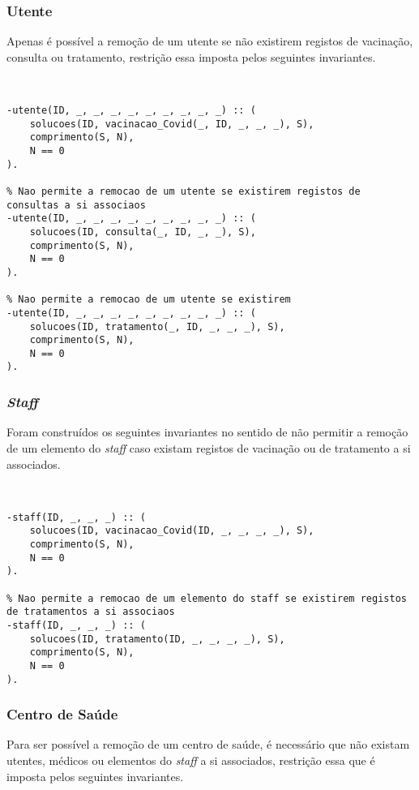 \subsubsection*{Utente}
Apenas é possível a remoção de um utente se não existirem registos de vacinação, consulta ou tratamento, restrição essa
imposta pelos seguintes invariantes.

\

\begin{lstlisting}[caption={Invariantes de remoção relativos ao predicado \texttt{utente}}]
% Nao permite a remocao de um utente se existirem registos de vacinacao a si associados
-utente(ID, _, _, _, _, _, _, _, _, _) :: (
    solucoes(ID, vacinacao_Covid(_, ID, _, _, _), S),
    comprimento(S, N),
    N == 0
).

% Nao permite a remocao de um utente se existirem registos de consultas a si associaos
-utente(ID, _, _, _, _, _, _, _, _, _) :: (
    solucoes(ID, consulta(_, ID, _, _), S),
    comprimento(S, N),
    N == 0
).

% Nao permite a remocao de um utente se existirem
-utente(ID, _, _, _, _, _, _, _, _, _) :: (
    solucoes(ID, tratamento(_, ID, _, _, _), S),
    comprimento(S, N),
    N == 0
).
\end{lstlisting}

\subsubsection*{\textit{Staff}}
Foram construídos os seguintes invariantes no sentido de não permitir a remoção de um elemento do \textit{staff}
caso existam registos de vacinação ou de tratamento a si associados.

\

\begin{lstlisting}[caption={Invariantes de remoção relativos ao predicado \texttt{staff}}]
% Nao permite a remocao de um elemento do staff se existirem registos de vacinacao a si associaos
-staff(ID, _, _, _) :: (
    solucoes(ID, vacinacao_Covid(ID, _, _, _, _), S),
    comprimento(S, N),
    N == 0
).

% Nao permite a remocao de um elemento do staff se existirem registos de tratamentos a si associaos
-staff(ID, _, _, _) :: (
    solucoes(ID, tratamento(ID, _, _, _, _), S),
    comprimento(S, N),
    N == 0
).
\end{lstlisting}

\subsubsection*{Centro de Saúde}
Para ser possível a remoção de um centro de saúde, é necessário que não existam utentes, médicos ou elementos do \textit{staff}
a si associados, restrição essa que é imposta pelos seguintes invariantes.

